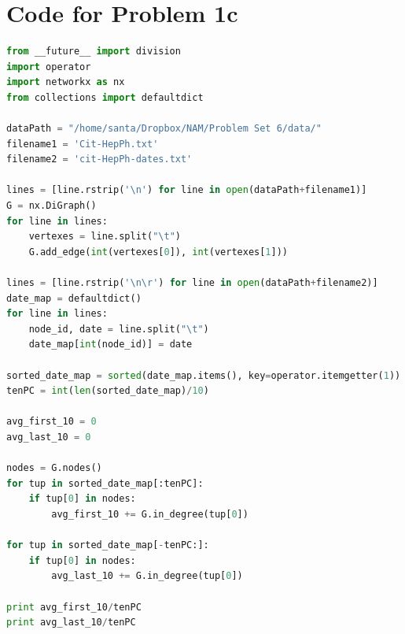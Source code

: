\documentclass{article}
\begin{document}
\section*{Code for Problem 1c}
\begin{lstlisting}[language=Python, breaklines=true]
from __future__ import division
import operator
import networkx as nx
from collections import defaultdict

dataPath = "/home/santa/Dropbox/NAM/Problem Set 6/data/"
filename1 = 'Cit-HepPh.txt'
filename2 = 'cit-HepPh-dates.txt'

lines = [line.rstrip('\n') for line in open(dataPath+filename1)]
G = nx.DiGraph()
for line in lines:
    vertexes = line.split("\t")
    G.add_edge(int(vertexes[0]), int(vertexes[1]))
    
lines = [line.rstrip('\n\r') for line in open(dataPath+filename2)]
date_map = defaultdict()
for line in lines:
    node_id, date = line.split("\t")
    date_map[int(node_id)] = date

sorted_date_map = sorted(date_map.items(), key=operator.itemgetter(1))
tenPC = int(len(sorted_date_map)/10)

avg_first_10 = 0
avg_last_10 = 0

nodes = G.nodes()
for tup in sorted_date_map[:tenPC]:
    if tup[0] in nodes:
        avg_first_10 += G.in_degree(tup[0])

for tup in sorted_date_map[-tenPC:]:
    if tup[0] in nodes:
        avg_last_10 += G.in_degree(tup[0])

print avg_first_10/tenPC
print avg_last_10/tenPC 
\end{lstlisting}
\hspace{5mm}
\end{document}
